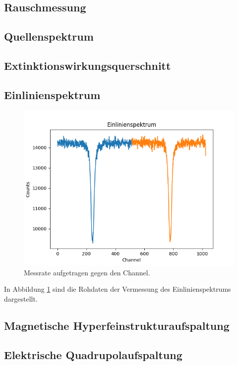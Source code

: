 \documentclass[12pt,a4paper]{article}
\begin{document}
\subsection{Rauschmessung}
\subsection{Quellenspektrum}
\subsection{Extinktionswirkungsquerschnitt}

\subsection{Einlinienspektrum}
\begin{figure}
\centering
\includegraphics[scale=0.8]{Bilder/Einlinien/Ein_Rohdaten.png}
\caption{Messrate aufgetragen gegen den Channel.}
\label{fig:Ein_Roh}
\end{figure}

In Abbildung \ref{fig:Ein_Roh} sind die Rohdaten der Vermessung des Einlinienspektrums dargestellt.\\


\subsection{Magnetische Hyperfeinstrukturaufspaltung}
\subsection{Elektrische Quadrupolaufspaltung}
\end{document}
